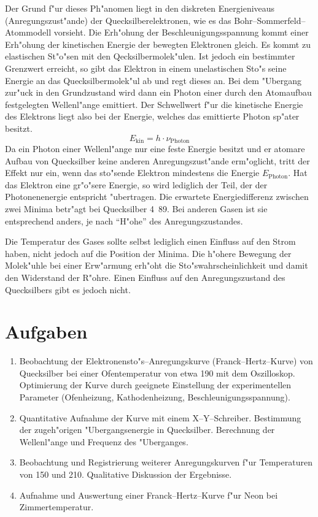\documentclass[a4paper,10pt]{article}
\begin{document}
Der Grund f"ur dieses Ph"anomen liegt in den diskreten Energieniveaus (Anregungszust"ande) der Quecksilberelektronen, wie es das Bohr--Sommerfeld--Atommodell vorsieht. Die Erh"ohung der Beschleunigungsspannung kommt einer Erh"ohung der kinetischen Energie der bewegten Elektronen gleich. Es kommt zu elastischen St"o"sen mit den Qecksilbermolek"ulen. Ist jedoch ein bestimmter Grenzwert erreicht, so gibt das Elektron in einem unelastischen Sto"s seine Energie an das Quecksilbermolek"ul ab und regt dieses an. Bei dem "Ubergang zur"uck in den Grundzustand wird dann ein Photon einer durch den Atomaufbau festgelegten Wellenl"ange emittiert. Der Schwellwert f"ur die kinetische Energie des Elektrons liegt also bei der Energie, welches das emittierte Photon sp"ater besitzt.
\begin{equation}
E_\text{kin} = h \cdot \nu_\text{Photon} \label{energie}
\end{equation}
Da ein Photon einer Wellenl"ange nur eine feste Energie besitzt und er atomare Aufbau von Quecksilber keine anderen Anregungszust"ande erm"oglicht, tritt der Effekt nur ein, wenn das sto"sende Elektron mindestens die Energie $E_\text{Photon}$. Hat das Elektron eine gr"o"sere Energie, so wird lediglich der Teil, der der Photonenenergie entspricht "ubertragen. Die erwartete Energiedifferenz zwischen zwei Minima betr"agt bei Quecksilber \unit{4.89}{\electronvolt}. Bei anderen Gasen ist sie entsprechend anders, je nach "`H"ohe"' des Anregungszustandes.

Die Temperatur des Gases sollte selbst lediglich einen Einfluss auf den Strom haben, nicht jedoch auf die Position der Minima. Die h"ohere Bewegung der Molek"uhle bei einer Erw"armung erh"oht die Sto"swahrscheinlichkeit und damit den Widerstand der R"ohre. Einen Einfluss auf den Anregungszustand des Quecksilbers gibt es jedoch nicht.

\section{Aufgaben}
\begin{enumerate}
\item Beobachtung der Elektronensto"s--Anregungskurve (Franck--Hertz--Kurve) von Quecksilber bei einer Ofentemperatur von etwa \unit{190}{\celsius} mit dem Oszilloskop. Optimierung der Kurve durch geeignete Einstellung der experimentellen Parameter (Ofenheizung, Kathodenheizung, Beschleunigungsspannung).
\item Quantitative Aufnahme der Kurve mit einem X--Y--Schreiber. Bestimmung der zugeh"origen "Ubergangsenergie in Quecksilber. Berechnung der Wellenl"ange und Frequenz des "Uberganges.
\item Beobachtung und Registrierung weiterer Anregungskurven f"ur Temperaturen von 150 und \unit{210}{\celsius}. Qualitative Diskussion der Ergebnisse.
\item Aufnahme und Auswertung einer Franck--Hertz--Kurve f"ur Neon bei Zimmertemperatur.
\end{enumerate}
\end{document}
